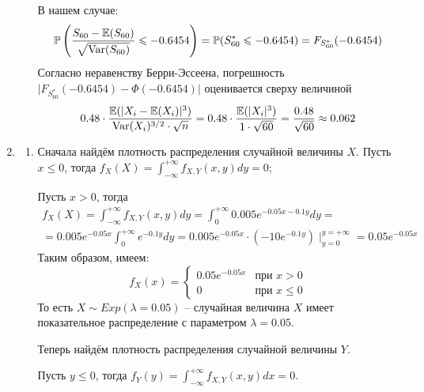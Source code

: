 \documentclass[12pt, a4paper]{article}\usepackage[]{graphicx}\usepackage[]{color}
\begin{document}
\begin{enumerate}
\begin{enumerate}
	В нашем случае:
	\[
	\mathbb{P}\left( \frac{S_{60} - \mathbb{E}(S_{60})}{\sqrt{\operatorname{Var}(S_{60})}} \leqslant -0.6454 \right) = \mathbb{P}(S^*_{60} \leqslant -0.6454) = 
	F_{S^*_{60}} (-0.6454)
	\]
	Согласно неравенству Берри-Эссеена, погрешность $\vert F_{S^*_{60}} (-0.6454) - \Phi(-0.6454) \vert$ оценивается сверху величиной
	\[
	0.48 \cdot \frac{\mathbb{E}(\vert X_i - \mathbb{E}(X_i) \vert^3 )}{\operatorname{Var}(X_i)^{3/2} \cdot \sqrt{n}} = 0.48 \cdot \frac{\mathbb{E}(\vert X_i \vert^3)}{1\cdot\sqrt{60}} = \frac{0.48}{\sqrt{60}} \approx0.062
	\]
\end{enumerate}
\item \begin{enumerate}
	\item Сначала найдём плотность распределения случайной величины $X$. Пусть $x \leq 0 $, тогда $f_X (X) = \int_{-\infty}^{+\infty} f_{X, Y} (x, y) dy  = 0$;
	
	Пусть $x >0 $, тогда 
	\begin{multline*}
	f_X (X) = \int_{-\infty}^{+\infty} f_{X, Y} (x, y) dy = \int_{0}^{+\infty} 0.005 e^{-0.05x-0.1y} dy = \\
	= 0.005e^{-0.05x} \int_{0}^{+\infty} e^{-0.1y} dy = 0.005e^{-0.05x} \cdot \left(-10e^{-0.1y} \right) \mid_{y=0}^{y=+\infty} = 0.05 e^{-0.05x}
	\end{multline*}
	Таким образом, имеем:
	\[
	f_X (x) = \begin{cases}
	0.05 e^{-0.05x} & \text{при } x>0 \\
	0 & \text{при } x \leq 0
	\end{cases}
	\]
	То есть $X \sim Exp(\lambda=0.05)$ – случайная величина $X$ имеет показательное распределение с параметром $\lambda = 0.05$.
	
	Теперь найдём плотность распределения случайной величины $Y$.
	
	Пусть $y \leq 0 $, тогда $f_Y (y) = \int_{-\infty}^{+\infty} f_{X, Y} (x, y) dx  = 0$.
	

\end{enumerate}
\end{enumerate}
\end{document}
